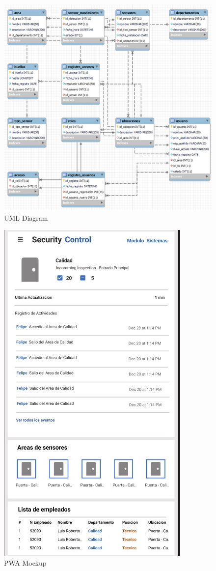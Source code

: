 \documentclass{IEEEtran}
\begin{document}
	\begin{figure}[h]
		\centering
		\includegraphics[width=0.8\linewidth]{Diagrama_UML.png}
		\caption{UML Diagram}
		\label{fig:uml}
	\end{figure}
	
	\begin{figure}[h]
		\centering
		\includegraphics[width=0.8\linewidth]{Mockup Mobile.jpg}
		\caption{PWA Mockup}
		\label{fig:pwa_mockup}
	\end{figure}
	
\end{document}
